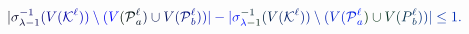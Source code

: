 \documentclass[12pt]{article}
\begin{document}
\makeatletter
\renewcommand*{\@textcolor}[3]{%
  \protect\leavevmode
  \begingroup
    \color#1{#2}#3%
  \endgroup
}
\makeatother
\begin{displaymath}
\mathcolor[RGB]{0,0,15}{|} \mathcolor[RGB]{0,0,30}{\sigma} _ { \mathcolor[RGB]{0,0,45}{\lambda} \mathcolor[RGB]{0,0,60}{-} \mathcolor[RGB]{0,0,75}{1} } ^ { \mathcolor[RGB]{0,0,90}{-} \mathcolor[RGB]{0,0,105}{1} } \mathcolor[RGB]{0,0,120}{(} \mathcolor[RGB]{0,0,135}{V} \mathcolor[RGB]{0,0,150}{(} \mathcal { \mathcolor[RGB]{0,0,165}{K} } ^ { \mathcolor[RGB]{0,0,180}{\ell} } \mathcolor[RGB]{0,0,195}{)} \mathcolor[RGB]{0,0,210}{)} \mathcolor[RGB]{0,0,225}{\setminus} \mathcolor[RGB]{0,0,240}{(} \mathcolor[RGB]{0,0,255}{V} \mathcolor[RGB]{0,15,0}{(} \mathcal { \mathcolor[RGB]{0,15,15}{P} } _ { \mathcolor[RGB]{0,15,30}{a} } ^ { \mathcolor[RGB]{0,15,45}{\ell} } \mathcolor[RGB]{0,15,60}{)} \mathcolor[RGB]{0,15,75}{\cup} \mathcolor[RGB]{0,15,90}{V} \mathcolor[RGB]{0,15,105}{(} \mathcal { \mathcolor[RGB]{0,15,120}{P} } _ { \mathcolor[RGB]{0,15,135}{b} } ^ { \mathcolor[RGB]{0,15,150}{\ell} } \mathcolor[RGB]{0,15,165}{)} \mathcolor[RGB]{0,15,180}{)} \mathcolor[RGB]{0,15,195}{|} \mathcolor[RGB]{0,15,210}{-} \mathcolor[RGB]{0,15,225}{|} \mathcolor[RGB]{0,15,240}{\sigma} _ { \mathcolor[RGB]{0,15,255}{\lambda} \mathcolor[RGB]{0,30,0}{-} \mathcolor[RGB]{0,30,15}{1} } ^ { \mathcolor[RGB]{0,30,30}{-} \mathcolor[RGB]{0,30,45}{1} } \mathcolor[RGB]{0,30,60}{(} \mathcolor[RGB]{0,30,75}{V} \mathcolor[RGB]{0,30,90}{(} \mathcal { \mathcolor[RGB]{0,30,105}{K} } ^ { \mathcolor[RGB]{0,30,120}{\ell} } \mathcolor[RGB]{0,30,135}{)} \mathcolor[RGB]{0,30,150}{)} \mathcolor[RGB]{0,30,165}{\setminus} \mathcolor[RGB]{0,30,180}{(} \mathcolor[RGB]{0,30,195}{V} \mathcolor[RGB]{0,30,210}{(} \mathcal { \mathcolor[RGB]{0,30,225}{P} } _ { \mathcolor[RGB]{0,30,240}{a} } ^ { \mathcolor[RGB]{0,30,255}{\ell} } \mathcolor[RGB]{0,45,0}{)} \mathcolor[RGB]{0,45,15}{\cup} \mathcolor[RGB]{0,45,30}{V} \mathcolor[RGB]{0,45,45}{(} \mathcolor[RGB]{0,45,60}{\mathscr} { \mathcolor[RGB]{0,45,75}{P} } _ { \mathcolor[RGB]{0,45,90}{b} } ^ { \mathcolor[RGB]{0,45,105}{\ell} } \mathcolor[RGB]{0,45,120}{)} \mathcolor[RGB]{0,45,135}{)} \mathcolor[RGB]{0,45,150}{|} \mathcolor[RGB]{0,45,165}{\leq} \mathcolor[RGB]{0,45,180}{1} \mathcolor[RGB]{0,45,195}{.}
\end{displaymath}
\end{document}
